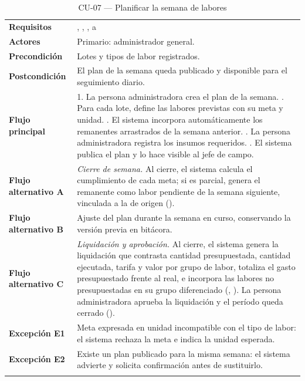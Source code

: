 \begin{longtable}{|L{3.4cm}|L{12.0cm}|}
\hline
{}\\
\hline
\textbf{Requisitos} & , , ,  a  \\ \hline
\textbf{Actores} & Primario: administrador general. \\ \hline
\textbf{Precondición} & Lotes y tipos de labor registrados. \\ \hline
\textbf{Postcondición} & El plan de la semana queda publicado y disponible para el seguimiento diario. \\ \hline
\textbf{Flujo principal} & 1. La persona administradora crea el plan de la semana. . Para cada lote, define las labores previstas con su meta y unidad. . El sistema incorpora automáticamente los remanentes arrastrados de la semana anterior. . La persona administradora registra los insumos requeridos. . El sistema publica el plan y lo hace visible al jefe de campo. \\ \hline
\textbf{Flujo alternativo A} & \emph{Cierre de semana.} Al cierre, el sistema calcula el cumplimiento de cada meta; si es parcial, genera el remanente como labor pendiente de la semana siguiente, vinculada a la de origen (). \\ \hline
\textbf{Flujo alternativo B} & Ajuste del plan durante la semana en curso, conservando la versión previa en bitácora. \\ \hline
\textbf{Flujo alternativo C} & \emph{Liquidación y aprobación.} Al cierre, el sistema genera la liquidación que contrasta cantidad presupuestada, cantidad ejecutada, tarifa y valor por grupo de labor, totaliza el gasto presupuestado frente al real, e incorpora las labores no presupuestadas en su grupo diferenciado (, ). La persona administradora aprueba la liquidación y el período queda cerrado (). \\ \hline
\textbf{Excepción E1} & Meta expresada en unidad incompatible con el tipo de labor: el sistema rechaza la meta e indica la unidad esperada. \\ \hline
\textbf{Excepción E2} & Existe un plan publicado para la misma semana: el sistema advierte y solicita confirmación antes de sustituirlo. \\ \hline
\caption{CU-07 --- Planificar la semana de labores}
\end{longtable}

